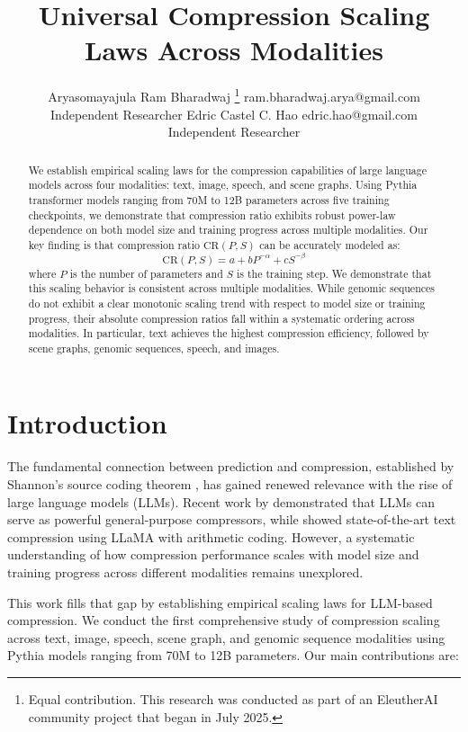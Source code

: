 \documentclass[10pt]{article} %
\title{Universal Compression Scaling Laws Across Modalities}
\author{\name Aryasomayajula Ram Bharadwaj \thanks{%
Equal contribution. This research was conducted as part of an EleutherAI community project that began in July 2025.}
      \email ram.bharadwaj.arya@gmail.com \\
      \addr Independent Researcher
      \AND
      \name Edric Castel C. Hao \footnotemark[1] \email edric.hao@gmail.com \\
      \addr Independent Researcher}
\begin{document}
\maketitle

\begin{abstract}
We establish empirical scaling laws for the compression capabilities of large language models across four modalities: text, image, speech, and scene graphs. Using Pythia transformer models ranging from 70M to 12B parameters across five training checkpoints, we demonstrate that compression ratio exhibits robust power-law dependence on both model size and training progress across multiple modalities. Our key finding is that compression ratio $\mathrm{CR}(P,S)$ can be accurately modeled as:
\[
\mathrm{CR}(P,S) = a + b P^{-\alpha} + c S^{-\beta}
\]
where $P$ is the number of parameters and $S$ is the training step. We demonstrate that this scaling behavior is consistent across multiple modalities. While genomic sequences do not exhibit a clear monotonic scaling trend with respect to model size or training progress, their absolute compression ratios fall within a systematic ordering across modalities. In particular, text achieves the highest compression efficiency, followed by scene graphs, genomic sequences, speech, and images.
\end{abstract}

\section{Introduction}

The fundamental connection between prediction and compression, established by Shannon's source coding theorem \citep{shannon1948mathematical}, has gained renewed relevance with the rise of large language models (LLMs). Recent work by \citet{deletang2024compression} demonstrated that LLMs can serve as powerful general-purpose compressors, while \citet{kaushik2023llmzip} showed state-of-the-art text compression using LLaMA with arithmetic coding. However, a systematic understanding of how compression performance scales with model size and training progress across different modalities remains unexplored.

This work fills that gap by establishing empirical scaling laws for LLM-based compression. We conduct the first comprehensive study of compression scaling across text, image, speech, scene graph, and genomic sequence modalities using Pythia models \citep{biderman2023pythia} ranging from 70M to 12B parameters. Our main contributions are:
\end{document}
